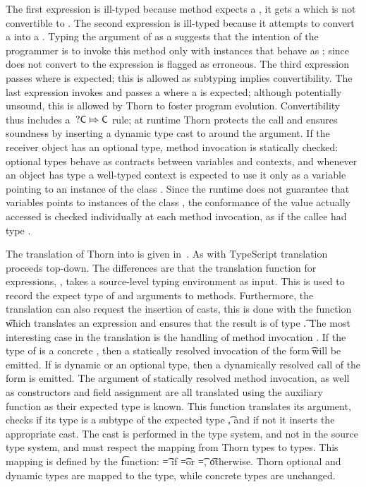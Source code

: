 \documentclass[acmsmall, anonymous, authordraft, review]{acmart} %
\begin{document}
The first expression is ill-typed because method \n expects a \C, it gets
a \D which is not convertible to \C. The second expression is ill-typed
because it attempts to convert a \D into a \dt\C.  Typing the argument of \m
as a \dt\C suggests that the intention of the programmer is to invoke this
method only with instances that behave as \C; since \D does not convert to
\C the expression is flagged as erroneous. The third expression passes \C
where \dt\C is expected; this is allowed as subtyping implies
convertibility.  The last expression invokes \n and passes a \dt\C where a
\C is expected; although potentially unsound, this is allowed by Thorn to
foster program evolution.  Convertibility thus includes a \(\dt\C\Mapsto\C\)
rule; at runtime Thorn protects the call and ensures soundness by inserting
a dynamic type cast to \C around the argument.  If the receiver object has
an optional type, method invocation is statically checked: optional types
behave as contracts between variables and contexts, and whenever an object
has type \dt\C a well-typed context is expected to use it only as a variable
pointing to an instance of the class \C.  Since the runtime does not
guarantee that \dt\C variables points to instances of the class \C, the
conformance of the value actually accessed is checked individually at each
method invocation, as if the callee had type \any.

The translation of Thorn into \kafka is given in~. As with
TypeScript translation proceeds top-down. The differences are that the
translation function for expressions, \TRG{\e}\Env, takes a source-level
typing environment as input. This is used to record the expect type of \this
and arguments \x to methods. Furthermore, the translation can also request
the insertion of casts, this is done with the function \TAG{\e}\Env\t which
translates an expression and ensures that the result is of type \t. The most
interesting case in the translation is the handling of method invocation
\Call\e\m\ep. If the type of \e is a concrete \C, then a statically resolved
invocation of the form \KCall\e\m\ep\t\tp will be emitted. If \e is dynamic
or an optional type, then a dynamically resolved call of the form
\DynCall\e\m\ep is emitted.  The argument of statically resolved method
invocation, as well as constructors and field assignment are all translated
using the auxiliary function as their expected type is known.  This function
translates its argument, checks if its type is a subtype of the expected
type \t, and if not it inserts the appropriate cast.  The cast is performed
in the \kafka type system, and not in the source type system, and must
respect the mapping from Thorn types to \kafka types.  This mapping is
defined by the \kty\t function: \kty\t = \any if \t=\dt\C or \t=\any, \t
otherwise.  Thorn optional and dynamic types are mapped to the \any type,
while concrete types are unchanged.
\end{document}
